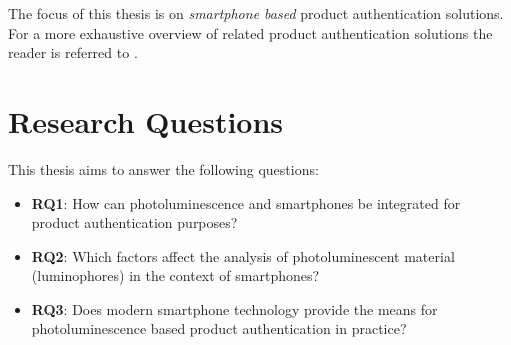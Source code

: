 \documentclass[thesis.tex]{subfiles}
\begin{document}
The focus of this thesis is on \emph{smartphone based} product authentication solutions. For a more exhaustive overview of related product authentication solutions the reader is referred to \cite{kuosmanen}.

\section{Research Questions}
\label{chapter:research-questions}

This thesis aims to answer the following questions:

\begin{itemize}
  \item \label{RQ1} \textbf{RQ1}: How can photoluminescence and smartphones be integrated for product authentication purposes?
  \item \label{RQ2} \textbf{RQ2}: Which factors affect the analysis of photoluminescent material (luminophores) in the context of smartphones?
  \item \label{RQ3} \textbf{RQ3}: Does modern smartphone technology provide the means for photoluminescence based product authentication in practice?
\end{itemize}
\end{document}

